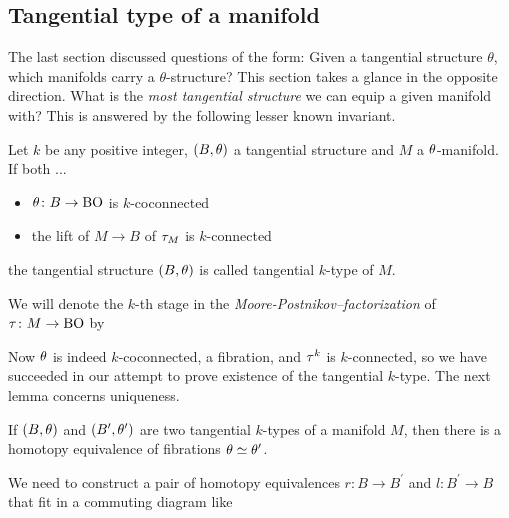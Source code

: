 \subsection{Tangential type of a manifold}
The last section discussed questions of the form: Given a tangential structure $\theta$, which manifolds carry a $\theta$-structure?
This section takes a glance in the opposite direction.
What is the \emph{most tangential structure} we can equip a given manifold with? 
This is answered by the following lesser known invariant.
\begin{defi}
    Let $k$ be any positive integer, $(B,\theta)$ a tangential structure and $M$ a $\theta$-manifold. If both ...
    \begin{itemize}[noitemsep, label=$\dots$]
        \item $\theta \colon B\to \mathrm{BO}$ is $k$-coconnected
        \item the lift of $M \to B$ of $\tau_M$ is $k$-connected
    \end{itemize}
    the tangential structure $(B,\theta)$ is called tangential $k$-type of $M$.
\end{defi}
We will denote the $k$-th stage in the \emph{Moore-Postnikov--factorization} of $\tau\colon M \to \mathrm{BO}$ by 
\begin{center}
\end{center}
Now $\theta$ is indeed $k$-coconnected, a fibration, and $\tau^k$ is $k$-connected, so we have succeeded in our attempt to prove existence of the tangential $k$-type. 
The next lemma concerns uniqueness.
\begin{thesislemma}\label{ttunique}
    If $(B,\theta)$ and $(B^\prime,\theta^\prime)$ are two tangential $k$-types of a manifold $M$, then there is a homotopy equivalence of fibrations $\theta\simeq\theta^\prime$.
\end{thesislemma}
\prf
We need to construct a pair of homotopy equivalences $ r\colon B \to B^\prime$ and $l\colon B^\prime\to B$ that fit in a commuting diagram like
    \begin{center}
    \end{center}
